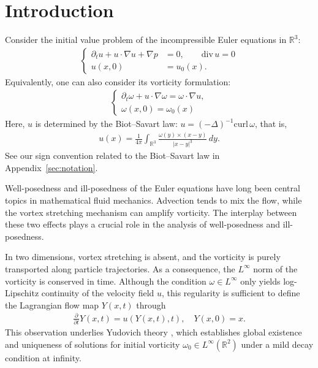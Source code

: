 \documentclass[reqno,11pt]{amsart}
\begin{document}
\maketitle

\setcounter{tocdepth}{2}
\tableofcontents


\section{Introduction}
Consider the initial value problem of the incompressible Euler equations in $\mathbb{R}^3$:
    \begin{align}
    \label{eq:Euler}
    \left\{
        \begin{aligned}
           \partial_t u + u\cdot \nabla u + \nabla p
        &=
            0, 
           \qquad \mathrm{div}\, u=0
           \\
           u(x,0)
        &=
            u_0(x).
        \end{aligned}
    \right.
    \end{align}
Equivalently, one can also consider its vorticity formulation:
    \begin{align}
    \label{main_eq}
    \left\{
    \begin{aligned}
        \partial_t \omega + u\cdot \nabla \omega = \omega \cdot \nabla u,
    \\
        \omega(x,0)=\omega_0(x)
    \end{aligned}
    \right.
    \end{align}
Here,  $u$ is determined by the Biot--Savart law: $u=(-\Delta)^{-1} \mathrm{curl} \, \omega$, that is,
    \begin{align}
    \label{eq:gen_Biot-Savart}
        u(x)= \frac{1}{4\pi}
        \int_{\mathbb{R}^3} 
        \frac{\omega (y)\times (x-y) }{|x-y|^3} \, dy.
    \end{align}
See our sign convention related to the Biot--Savart law in Appendix~\ref{sec:notation}.

Well-posedness and ill-posedness of the Euler equations have long been central topics in mathematical fluid mechanics. 
Advection tends to mix the flow, while the vortex stretching mechanism can amplify vorticity. 
The interplay between these two effects plays a crucial role in the analysis of well-posedness and ill-posedness. 

In two dimensions, vortex stretching is absent, and the vorticity is purely transported along  particle trajectories. As a consequence, the $L^\infty$ norm of the vorticity is conserved in time. Although the condition $\omega\in L^\infty$ only yields log-Lipschitz continuity of the velocity field $u$, this regularity is sufficient to define the Lagrangian flow map $Y(x,t)$ through
    \begin{align*}
        \frac{\partial }{\partial t} Y(x,t) = u(Y(x,t),t ), \quad Y(x,0)=x.
    \end{align*}
This observation underlies Yudovich theory \cite{Yudovich63}, which establishes global existence and uniqueness of solutions  for initial vorticity $\omega_0 \in L^\infty (\mathbb{R}^2)$ under a mild decay condition at infinity. 
\end{document}

